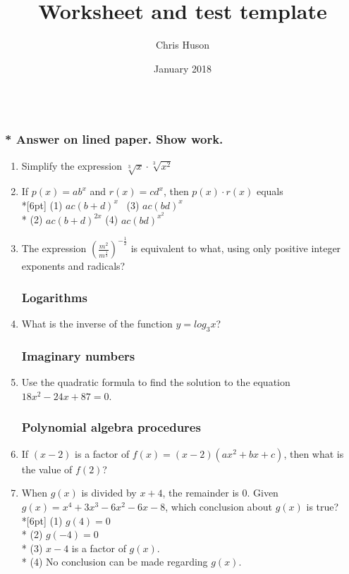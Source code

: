 \documentclass[12pt, oneside]{article}
\title{Worksheet and test template}
\author{Chris Huson}
\date{January 2018}
\begin{document}
\subsubsection*{\\* Answer on lined paper. Show work.}

\begin{enumerate}

\vspace{0.5 cm}

\subsubsection*{Rational exponents and radicals}

\item Simplify the expression $\sqrt[3]{x} \cdot \sqrt[3]{x^2}$

\item If $p(x)=ab^x$ and $r(x)=cd^x$, then $p(x) \cdot r(x)$ equals \\*[6pt]
(1) $ac(b+d)^x$ \, \qquad (3) $ac(bd)^x$\\* 
(2) $ac(b+d)^{2x}$ \qquad (4) $ac(bd)^{x^2}$


\item The expression $\displaystyle \left( \frac{m^2}{m^{\frac{1}{3}}} \right)^{-\frac{1}{2}}$ is equivalent to what, using only positive integer exponents and radicals?

\subsubsection*{Logarithms}
\item What is the inverse of the function $y=log_3 x$?


\subsubsection*{Imaginary numbers}
\item Use the quadratic formula to find the solution to the equation $18x^2-24x+87=0$.


\subsubsection*{Polynomial algebra procedures}

\item If $(x-2)$ is a factor of $f(x)=(x-2)(ax^2+bx+c)$, then what is the value of $f(2)$?

\item When $g(x)$ is divided by $x+4$, the remainder is 0. Given $g(x)=x^4+3x^3- 6x^2- 6x-8$, which conclusion about $g(x)$ is true?\\*[6pt]
(1) $g(4)=0$ \\*
(2) $g(-4)=0$ \\*
(3) $x-4$ is a factor of $g(x)$.\\*
(4) No conclusion can be made regarding $g(x)$.


\end{enumerate}
\end{document}

